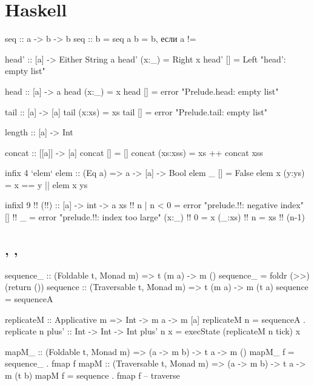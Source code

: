\documentclass[11pt,a4paper]{article}
\begin{document}
\section{Haskell}
\begin{minipage}{0.47\textwidth}
\begin{hscode}
seq :: a -> b -> b
seq :: \bot b =  \bot
seq a b = b, если a != \bot
\end{hscode}
\begin{hscode}
head' :: [a] -> Either String a
head' (x:_) = Right x
head' [] = Left "head': empty list"
\end{hscode}
\begin{hscode}
head :: [a] -> a
head (x:_) = x
head [] = error "Prelude.head: empty list"
\end{hscode}
\begin{hscode}
tail :: [a] -> [a]
tail (x:xs) = xs
tail [] = error "Prelude.tail: empty list"
\end{hscode}
\end{minipage}
\hfill
\begin{minipage}{0.47\textwidth}
\begin{hscode}
length :: [a] -> Int

concat :: [[a]] -> [a]
concat [] = []
concat (xs:xss) = xs ++ concat xss
\end{hscode}
\begin{hscode}
infix 4 `elem`
elem :: (Eq a) => a -> [a] -> Bool
elem _ [] = False
elem x (y:ys) = x == y || elem x ys
\end{hscode}
\begin{hscode}
infixl 9 !!
(!!) :: [a] -> int -> a
xs     !! n | n < 0 = error "prelude.!!: negative index"
[]     !! _         = error "prelude.!!: index too large"
(x:_)  !! 0         = x
(_:xs) !! n         = xs !! (n-1)
\end{hscode}
\end{minipage}

\subsection{, , }
\begin{hscode}
sequence_ :: (Foldable t, Monad m) => t (m a) -> m ()
sequence_ = foldr (>>) (return ())
sequence :: (Traversable t, Monad m) => t (m a) -> m (t a)
sequence = sequenceA

replicateM :: Applicative m => Int -> m a -> m [a]
replicateM n = sequenceA . replicate n 
plus' :: Int -> Int -> Int
plus' n x = execState (replicateM n tick) x

mapM_ :: (Foldable t, Monad m) => (a -> m b) -> t a -> m ()
mapM_ f = sequence_ . fmap f
mapM :: (Traversable t, Monad m) => (a -> m b) -> t a -> m (t b)
mapM f = sequence . fmap f  -- traverse
\end{hscode}
\end{document}
